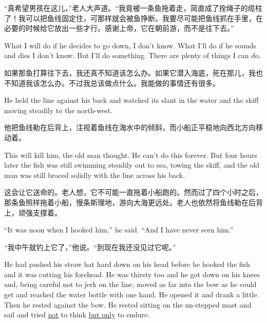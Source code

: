 \begin{paracol}{2}
\switchcolumn

“真希望男孩在这儿，”老人大声道。“我竟被一条鱼拖着走，简直成了拴绳子的缆柱了！我可以把鱼线固定住，可那样就会被鱼挣断。我要尽可能把鱼线抓在手里，在必要的时候给它放出一些才行。感谢上帝，它在朝前游，而不是往下去。”

\switchcolumn*

What I will do if he decides to go down, I don't know. What I'll do if he
\glspl{sound} and dies I don't know. But I'll do something. There are \gls{plenty} of
things I can do.

\switchcolumn

如果那鱼打算往下去，我还真不知道该怎么办。如果它潜入海底，死在那儿，我也不知道我该怎么办。不过我总该做点什么。我能做的事情还有很多。

\switchcolumn*

He held the line against his back and watched its slant in the water and the
skiff moving steadily to the north-west.

\switchcolumn

他把鱼线勒在后背上，注视着鱼线在海水中的倾斜，而小船正平稳地向西北方向移动着。

\switchcolumn*

This will kill him, the old man thought. He can't do this forever. But four
hours later the fish was still swimming steadily out to sea, towing the
skiff, and the old man was still \gls{braced} \gls{solidly} with the line
across his back.

\switchcolumn

这会让它送命的。老人想，它不可能一直拖着小船跑的。然而过了四个小时之后，那条鱼照样拖着小船，慢条斯理地，游向大海更远处。老人也依然将鱼线勒在后背上，顽强支撑着。

\switchcolumn*

``It was noon when I hooked him,'' he said. ``And I have never seen him.''

\switchcolumn

“我中午就钓上它了，”他说。“到现在我还没见过它呢。”

\switchcolumn*

He had pushed his \gls{straw} hat hard down on his head before he hooked the
fish and it was cutting his \gls{forehead}. He was \gls{thirsty} too and he
got down on his knees and, being careful not to \gls{jerk} on the line,
moved as far into the bow as he could get and reached the water bottle with
one hand. He opened it and drank a little. Then he rested against the bow.
He rested sitting on the \gls{un-stepped} mast and sail and tried \uline{not}
  to think \uline{but only} to \gls{endure}.


\end{paracol}

